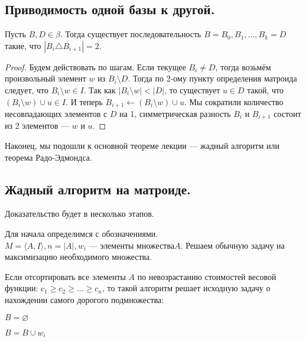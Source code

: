 \documentclass[a4paper, 12pt]{article}
\begin{document}
\subsection{Приводимость одной базы к другой.}

\begin{Lemma}
  Пусть $B, D \in \beta$. Тогда существует последовательность $B = B_0, B_1,
  \ldots, B_k = D$ такие, что $|B_i \triangle B_{i + 1}| = 2.$
\end{Lemma}

\begin{proof}
  Будем действовать по шагам. Если текущее $B_i \neq D$, тогда возьмём 
  произвольный элемент
  $w$ из $B_i \setminus D$. Тогда по 2-ому пункту определения матроида следует,
  что $B_i \setminus w \in I$. Так как $|B_i \setminus w| < |D|$, то существует
  $u \in D$ такой, что $(B_i \setminus w) \cup u \in I$. И теперь $B_{i + 1} 
  \gets (B_i \setminus w) \cup u$.
  Мы сократили количество несовпадающих элементов с $D$ на 1, симметрическая
  разность $B_i$ и $B_{i + 1}$ состоит из 2 элементов --- $w$ и $u$.
\end{proof}

Наконец, мы подошли к основной теореме лекции --- жадный алгоритм или теорема
Радо-Эдмондса.

\subsection{Жадный алгоритм на матроиде.}

Доказательство будет в несколько этапов.

Для начала определимся с обозначениями. $M = \langle A, I \rangle, n = |A|, w_i
\text{ --- элементы множества} A$.
Решаем обычную задачу на максимизацию необходимого множества.

\begin{Theorem}
  Если отсортировать все элементы $A$ по невозрастанию стоимостей весовой функции:
  $c_1 \geqslant c_2 \geqslant \ldots \geqslant c_n$, то такой алгоритм решает
  исходную задачу о нахождении самого дорогого подмножества:
  
  \rm{
  \begin{algorithm}[H]
    $B = \varnothing$

      {
       {
       $B = B \cup w_i$
      }
     }
  \end{algorithm}
  }
\end{Theorem}
\end{document}
